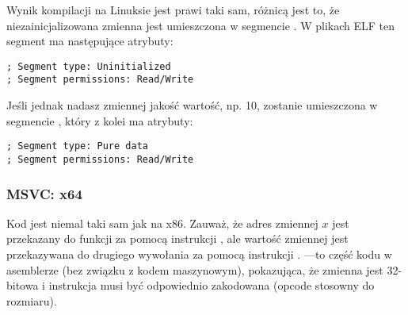 Wynik kompilacji na Linuksie jest prawi taki sam, różnicą jest to, że niezainicjalizowana zmienna jest umieszczona w segmencie .
W plikach \ac{ELF} ten segment ma następujące atrybuty:

\begin{lstlisting}
; Segment type: Uninitialized
; Segment permissions: Read/Write
\end{lstlisting}

Jeśli jednak nadasz zmiennej jakość wartość, np. 10,
zostanie umieszczona w segmencie , który z kolei ma atrybuty:

\begin{lstlisting}
; Segment type: Pure data
; Segment permissions: Read/Write
\end{lstlisting}

\subsubsection{MSVC: x64}



Kod jest niemal taki sam jak na x86.
Zauważ, że adres zmiennej $x$ jest przekazany do funkcji  za pomocą instrukcji \LEA,
ale wartość zmiennej jest przekazywana do drugiego wywołania \printf za pomocą instrukcji \MOV.
---to część kodu w asemblerze (bez związku z kodem maszynowym),
pokazująca, że zmienna jest 32-bitowa i instrukcja \MOV musi być odpowiednio zakodowana (opcode stosowny do rozmiaru).

